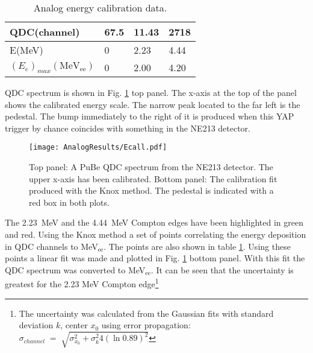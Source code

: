 \documentclass[main.tex]{subfiles}
\begin{document}
\begin{table}[hb]
	\center
	\begin{tabular}{|l|l|l|l|}
	\hline
	QDC(channel)             & 67.5 & 11.43 & 2718 \\
	\hline
	E(MeV)          & 0    & 2.23  & 4.44 \\
	\hline
	$(E_{e})_{max}(\textrm{MeV}_\textrm{{ee}})$ & 0    & 2.00  & 4.20 \\
	\hline
	\end{tabular}
   	\captionsetup{width=0.435\linewidth}
	\caption[Analog energy calibration data.]{Analog energy calibration data.}
	\label{tab:knox_a}
\end{table}

QDC spectrum is shown in Fig. \ref{fig:qdc_a} top panel. The x-axis at the top of the panel shows the calibrated energy scale. The narrow peak located to the far left is the pedestal. The bump immediately to the right of it is produced when this YAP trigger by chance coincides with something in the NE213 detector.
\begin{figure}[ht!]
    \centering
        \texttt{[image: AnalogResults/Ecall.pdf]}
        \caption[Energy calibration of the analog setup]{Top panel: A PuBe QDC spectrum from the NE213 detector. The upper x-axis has been calibrated. Bottom panel: The calibration fit produced with the Knox method. The pedestal is indicated with a red box in both plots.}
    \label{fig:qdc_a}
\end{figure}

The \SI{2.23}{MeV} and the \SI{4.44}{MeV} Compton edges have been highlighted in green and red. Using the Knox method a set of points correlating the energy deposition in QDC channels to \si{\MeV}$_\text{ee}$. The points are also shown in table \ref{tab:knox_a}. Using these points a linear fit was made and plotted in Fig. \ref{fig:qdc_a} bottom panel. With this fit the QDC spectrum was converted to \si{\MeV}$_\text{ee}$. It can be seen that the uncertainty is greatest for the 2.23 \si{\MeV} Compton edge\footnote{The uncertainty was calculated from the Gaussian fits with standard deviation $k$, center ${x}_0$ using error propagation: $\sigma_{channel}\;=\;\sqrt{\sigma_{x_0}^2 + \sigma_{k}^2 4\left(\ln0.89\right)^2 }$}
\end{document}
